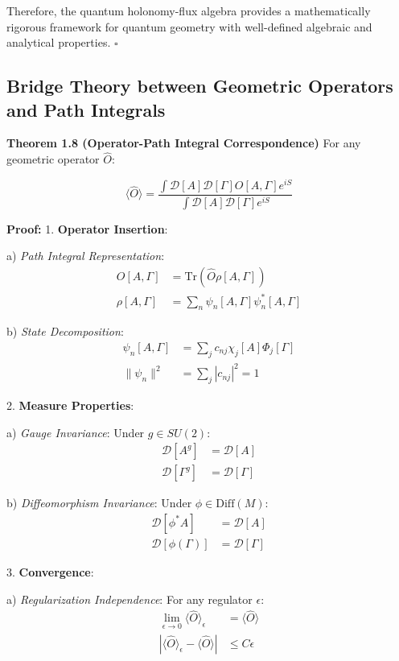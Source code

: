 \documentclass[12pt,a4paper]{article}
\begin{document}
Therefore, the quantum holonomy-flux algebra provides a mathematically rigorous framework for quantum geometry with well-defined algebraic and analytical properties. $\square$

\subsection{Bridge Theory between Geometric Operators and Path Integrals}

\textbf{Theorem 1.8 (Operator-Path Integral Correspondence)}
For any geometric operator $\hat{O}$:

\[
\langle\hat{O}\rangle = \frac{\int \mathcal{D}[A]\mathcal{D}[\Gamma] O[A,\Gamma]e^{iS}}{\int \mathcal{D}[A]\mathcal{D}[\Gamma] e^{iS}}
\]

\textbf{Proof:}
1. \textbf{Operator Insertion}:
   
   a) \textit{Path Integral Representation}:
      \[
      \begin{aligned}
      O[A,\Gamma] &= \text{Tr}(\hat{O}\rho[A,\Gamma]) \\
      \rho[A,\Gamma] &= \sum_n \psi_n[A,\Gamma]\psi_n^*[A,\Gamma]
      \end{aligned}
      \]
   
   b) \textit{State Decomposition}:
      \[
      \begin{aligned}
      \psi_n[A,\Gamma] &= \sum_j c_{nj}\chi_j[A]\Phi_j[\Gamma] \\
      \|\psi_n\|^2 &= \sum_j |c_{nj}|^2 = 1
      \end{aligned}
      \]

2. \textbf{Measure Properties}:
   
   a) \textit{Gauge Invariance}:
      Under $g \in SU(2)$:
      \[
      \begin{aligned}
      \mathcal{D}[A^g] &= \mathcal{D}[A] \\
      \mathcal{D}[\Gamma^g] &= \mathcal{D}[\Gamma]
      \end{aligned}
      \]
   
   b) \textit{Diffeomorphism Invariance}:
      Under $\phi \in \text{Diff}(M)$:
      \[
      \begin{aligned}
      \mathcal{D}[\phi^*A] &= \mathcal{D}[A] \\
      \mathcal{D}[\phi(\Gamma)] &= \mathcal{D}[\Gamma]
      \end{aligned}
      \]

3. \textbf{Convergence}:
   
   a) \textit{Regularization Independence}:
      For any regulator $\epsilon$:
      \[
      \begin{aligned}
      \lim_{\epsilon \to 0}\langle\hat{O}\rangle_\epsilon &= \langle\hat{O}\rangle \\
      |\langle\hat{O}\rangle_\epsilon - \langle\hat{O}\rangle| &\leq C\epsilon
      \end{aligned}
      \]
   
\end{document}
